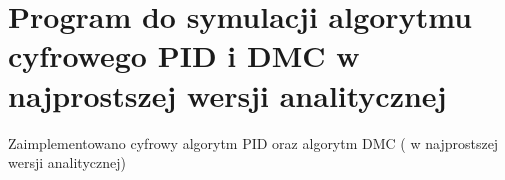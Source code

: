 \section{Program do symulacji algorytmu cyfrowego PID i DMC w najprostszej wersji analitycznej}
\label{projekt:zad3}

Zaimplementowano	cyfrowy	algorytm	PID	oraz	algorytm	DMC	(	w	najprostszej	
wersji	analitycznej)


\newpage
